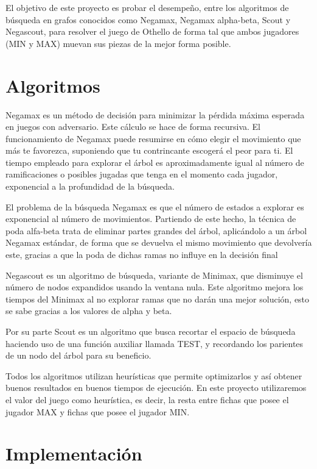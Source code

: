 \documentclass{article}
\begin{document}
El objetivo de este proyecto es probar el desempeño, entre los algoritmos de búsqueda
en grafos conocidos como Negamax, Negamax alpha-beta, Scout y Negascout, para resolver el juego
de Othello de forma tal que ambos jugadores (MIN y MAX) muevan sus piezas de la mejor
forma posible.

\section{Algoritmos}
\hspace{0.5cm}Negamax es un método de decisión para minimizar la pérdida máxima esperada en juegos con adversario. Este cálculo se hace de forma recursiva.
El funcionamiento de Negamax puede resumirse en cómo elegir el movimiento que más te favorezca, suponiendo que tu contrincante escogerá el peor para ti. El
tiempo empleado para explorar el árbol es aproximadamente igual al número de
ramificaciones o posibles jugadas que tenga en el momento cada jugador, exponencial a la
profundidad de la búsqueda.

El problema de la búsqueda Negamax es que el número de estados a explorar es exponencial al número de movimientos. Partiendo de este hecho, la técnica de poda alfa-beta trata de eliminar partes grandes del árbol, aplicándolo a un árbol Negamax estándar, de forma que se devuelva el mismo movimiento que devolvería este, gracias a que la poda de dichas ramas no influye en la decisión final

Negascout es un algoritmo de búsqueda, variante de Minimax, que disminuye el
número de nodos expandidos usando la ventana nula. Este algoritmo mejora los tiempos del
Minimax al no explorar ramas que no darán una mejor solución, esto se sabe gracias a los
valores de alpha y beta.

Por su parte Scout   es   un   algoritmo   que   busca   recortar   el   espacio   de   búsqueda   haciendo   uso   de   una   función  
auxiliar llamada TEST, y recordando los parientes de un nodo del árbol para su beneficio. 

Todos los algoritmos utilizan heurísticas que permite optimizarlos y así obtener buenos
resultados en buenos tiempos de ejecución. En este proyecto utilizaremos el
valor del juego como heurística, es decir, la resta entre fichas que posee el jugador MAX y fichas que posee el
jugador MIN.

\section{Implementación}
\end{document}
